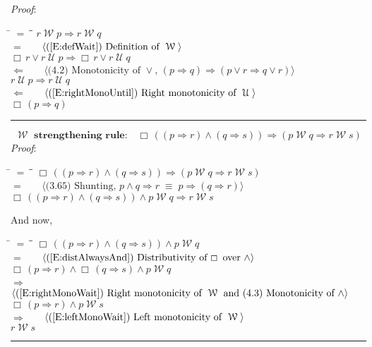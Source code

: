 \documentclass[12pt, fleqn, leqno]{article}
\newcommand{\lgap}{2pt}                             %
\newcommand{\mymathindent}{24pt}                    %
\newcommand{\equivs}{\ensuremath{\;\equiv\;}}       %
\newcommand{\impl}{\ensuremath{\Rightarrow}}        %
\newcommand{\foll}{\ensuremath{\Leftarrow}}         %
\newcommand{\Until}{\;\mathcal{U}\;}
\newcommand{\Wait}{\;\mathcal{W}\;}
\newcommand{\Always}{\Box\,}
\newcommand{\myqed}{\rule[-.23ex]{1.2ex}{2.0ex}}
\newcommand{\myqedtab}{\hspace{384pt}}              %
\newcommand{\Gll} {\langle}                         %
\newcommand{\Ggg} {\rangle}                         %
\newcommand{\Hint}[1]     {\ \ \ $\Gll              \mbox{#1} \Ggg$ }   %
\begin{document}
\emph{Proof}:
\begin{tabbing}
\hspace{\mymathindent} \= $= \;$ \= \myqedtab \= \kill
  \> \>   $r \Wait p \impl r \Wait q$\\[\lgap]
  \> $=$ \> \Hint{(\ref{E:defWait}) Definition of $\Wait$} \\[\lgap]
  \> \>   $\Always r \lor r \Until p \impl \Always r \lor r \Until q$\\[\lgap]
  \> $\foll$  \>  \Hint{(4.2) Monotonicity of $\lor$, $(p\impl q)\impl (p\lor r \impl q\lor r)$}\\[\lgap]
  \> \>   $r \Until p \impl r \Until q$\\[\lgap]
  \> $\foll$  \>  \Hint{(\ref{E:rightMonoUntil}) Right monotonicity of $\Until$}\\[\lgap]
  \> \>   $\Always (p \impl q)$ \quad \myqed
\end{tabbing}

\begin{equation}\label{E:waitstrength}
\textbf{$\Wait$ strengthening rule:}\quad \Always ((p \impl r) \land (q \impl s)) \impl (p \Wait q \impl r \Wait s)
\end{equation}
\emph{Proof}:
\begin{tabbing}
\hspace{\mymathindent} \= $= \;$ \= \myqedtab \= \kill
  \> \>   $\Always ((p \impl r) \land (q \impl s)) \impl (p \Wait q \impl r \Wait s)$\\[\lgap]
  \> $=$  \>  \Hint{(3.65) Shunting, $p\land q\impl r\equivs p\impl (q\impl r)$}\\[\lgap]
  \> \>   $\Always ((p \impl r) \land (q \impl s)) \land p \Wait q \impl r \Wait s$
\end{tabbing}
And now,
\begin{tabbing}
\hspace{\mymathindent} \= $= \;$ \= \myqedtab \= \kill
  \> \>   $\Always ((p \impl r) \land (q \impl s)) \land p \Wait q$\\[\lgap]
  \> $=$  \>  \Hint{(\ref{E:distAlwaysAnd}) Distributivity of $\Always$ over $\land$}\\[\lgap]
   \> \>   $\Always (p \impl r) \land \Always (q \impl s) \land p \Wait q$\\[\lgap]
   \> $\impl$  \>  \Hint{(\ref{E:rightMonoWait}) Right monotonicity of $\Wait$ and (4.3) Monotonicity of $\land$}\\[\lgap]
    \> \>   $\Always (p \impl r) \land p \Wait s$\\[\lgap]
    \> $\impl$  \>  \Hint{(\ref{E:leftMonoWait}) Left monotonicity of $\Wait$}\\[\lgap]
      \> \>   $r \Wait s$ \quad \myqed
\end{tabbing}
\end{document}
